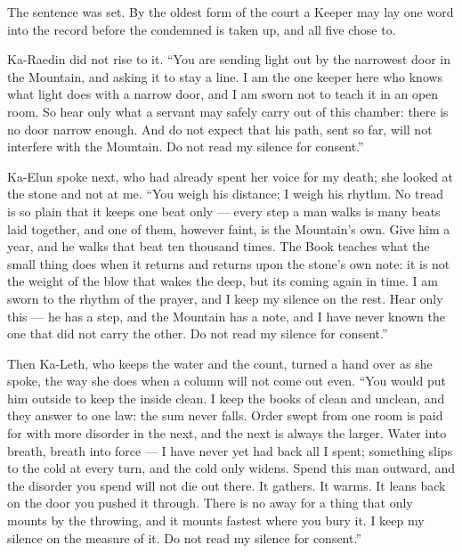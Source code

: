 The sentence was set. By the oldest form of the court a Keeper may lay one word into the record before the condemned is taken up, and all five chose to.\par

Ka-Raedin did not rise to it. ``You are sending light out by the narrowest door in the Mountain, and asking it to stay a line. I am the one keeper here who knows what light does with a narrow door, and I am sworn not to teach it in an open room. So hear only what a servant may safely carry out of this chamber: there is no door narrow enough. And do not expect that his path, sent so far, will not interfere with the Mountain. Do not read my silence for consent.''\par

Ka-Elun spoke next, who had already spent her voice for my death; she looked at the stone and not at me. ``You weigh his distance; I weigh his rhythm. No tread is so plain that it keeps one beat only --- every step a man walks is many beats laid together, and one of them, however faint, is the Mountain's own. Give him a year, and he walks that beat ten thousand times. The Book teaches what the small thing does when it returns and returns upon the stone's own note: it is not the weight of the blow that wakes the deep, but its coming again in time. I am sworn to the rhythm of the prayer, and I keep my silence on the rest. Hear only this --- he has a step, and the Mountain has a note, and I have never known the one that did not carry the other. Do not read my silence for consent.''\par

Then Ka-Leth, who keeps the water and the count, turned a hand over as she spoke, the way she does when a column will not come out even. ``You would put him outside to keep the inside clean. I keep the books of clean and unclean, and they answer to one law: the sum never falls. Order swept from one room is paid for with more disorder in the next, and the next is always the larger. Water into breath, breath into force --- I have never yet had back all I spent; something slips to the cold at every turn, and the cold only widens. Spend this man outward, and the disorder you spend will not die out there. It gathers. It warms. It leans back on the door you pushed it through. There is no away for a thing that only mounts by the throwing, and it mounts fastest where you bury it. I keep my silence on the measure of it. Do not read my silence for consent.''\par

